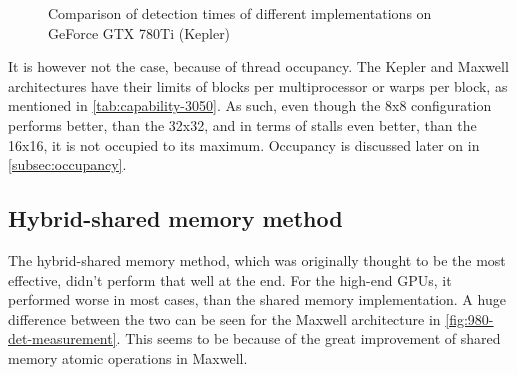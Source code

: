 \begin{figure}[ht]
	\label{fig:780ti-det-measurement}
\centering{}
	\caption{Comparison of detection times of different implementations on GeForce GTX 780Ti (Kepler)}
\end{figure}

It is however not the case, because of thread occupancy. The Kepler and Maxwell architectures have their limits of blocks per multiprocessor or warps per block, as mentioned in \ref{tab:capability-3050}. As such, even though the 8x8 configuration performs better, than the 32x32, and in terms of stalls even better, than the 16x16, it is not occupied to its maximum. Occupancy is discussed later on in \ref{subsec:occupancy}.

\subsection{Hybrid-shared memory method}

The hybrid-shared memory method, which was originally thought to be the most effective, didn't perform that well at the end. For the high-end GPUs, it performed worse in most cases, than the shared memory implementation. A huge difference between the two can be seen for the Maxwell architecture in \ref{fig:980-det-measurement}. This seems to be because of the great improvement of shared memory atomic operations in Maxwell.

